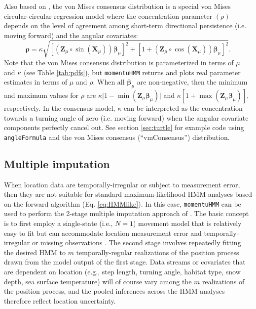 \documentclass[12pt]{article}\usepackage[]{graphicx}\usepackage[]{color}
\begin{document}
Also based on \cite{RivestEtAl2016}, the von Mises consensus distribution is a special von Mises circular-circular regression model where the concentration parameter $(\rho)$ depends on the level of agreement among short-term directional persistence (i.e. moving forward) and the angular covariates:
\begin{equation}
  {\boldsymbol \rho}=\kappa \sqrt{\left[({\mathbf Z}_\mu \circ \sin({\mathbf X}_\mu)){\boldsymbol \beta}_\mu\right]^2+\left[1+({\mathbf Z}_\mu \circ \cos({\mathbf X}_\mu)){\boldsymbol \beta}_\mu\right]^2}.
  \label{eq:consensus}
\end{equation}
Note that the von Mises consensus distribution is parameterized in terms of $\mu$ and $\kappa$ (see Table \ref{tab:pdfs}), but \verb|momentuHMM| returns and plots real parameter estimates in terms of $\mu$ and $\rho$. When all ${\boldsymbol \beta}_\mu$ are non-negative, then the minimum and maximum values for $\rho$ are $\kappa \lvert 1-\min({\mathbf Z}_\mu {\boldsymbol \beta}_\mu) \rvert$ and $\kappa \left[1+\max({\mathbf Z}_\mu {\boldsymbol \beta}_\mu)\right]$, respectively.  In the consensus model, $\kappa$ can be interpreted as the concentration towards a turning angle of zero (i.e. moving forward) when the angular covariate components perfectly cancel out. %
See section \ref{sec:turtle} for example code using \verb|angleFormula| and the von Mises consensus (``vmConsensus'') distribution.

\subsection{Multiple imputation}
\label{sec:mi}
When location data are temporally-irregular or subject to measurement error, then they are not suitable for standard maximum-likelihood HMM analyses based on the forward algorithm (Eq. \ref{eq:HMMlike}). In this case, \verb|momentuHMM| can be used to perform the 2-stage multiple imputation approach of \cite{McClintock2017}. The basic concept is to first employ a single-state (i.e., $N=1$) movement model that is relatively easy to fit but can accommodate location measurement error and temporally-irregular or missing observations \citep[e.g.][]{JohnsonEtAl2008}. The second stage involves repeatedly fitting the desired HMM to $m$ temporally-regular realizations of the position process drawn from the model output of the first stage.  Data streams or covariates that are dependent on location (e.g., step length, turning angle, habitat type, snow depth, sea surface temperature) will of course vary among the $m$ realizations of the position process, and the pooled inferences across the HMM analyses therefore reflect location uncertainty.  
\end{document}
